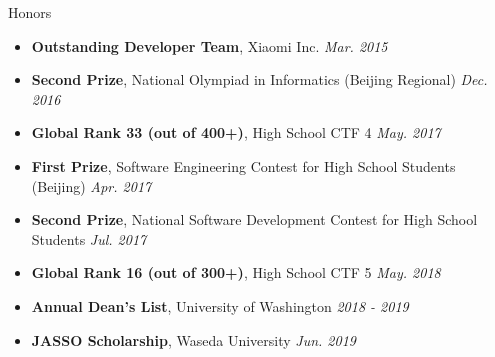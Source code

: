 \documentclass{resume}
\begin{document}

	\begin{rSection}{Honors}
		\begin{itemize}
			\setlength{\itemsep}{1pt}
			\setlength{\parskip}{0pt}
			\setlength{\parsep}{0pt}
			\item \textbf{Outstanding Developer Team}, Xiaomi Inc. \hfill {\em Mar. 2015}
			\item \textbf{Second Prize}, National Olympiad in Informatics (Beijing Regional) \hfill {\em Dec. 2016}
			\item \textbf{Global Rank 33 (out of 400+)}, High School CTF 4 \hfill {\em May. 2017}
			\item \textbf{First Prize}, Software Engineering Contest for High School Students (Beijing) \hfill {\em Apr. 2017}
			\item \textbf{Second Prize}, National Software Development Contest for High School Students \hfill {\em Jul. 2017}
			\item \textbf{Global Rank 16 (out of 300+)}, High School CTF 5 \hfill {\em May. 2018}
			\item \textbf{Annual Dean's List}, University of Washington \hfill {\em 2018 - 2019}
			\item \textbf{JASSO Scholarship}, Waseda University \hfill {\em Jun. 2019}
		\end{itemize}
	\end{rSection}
\end{document}
